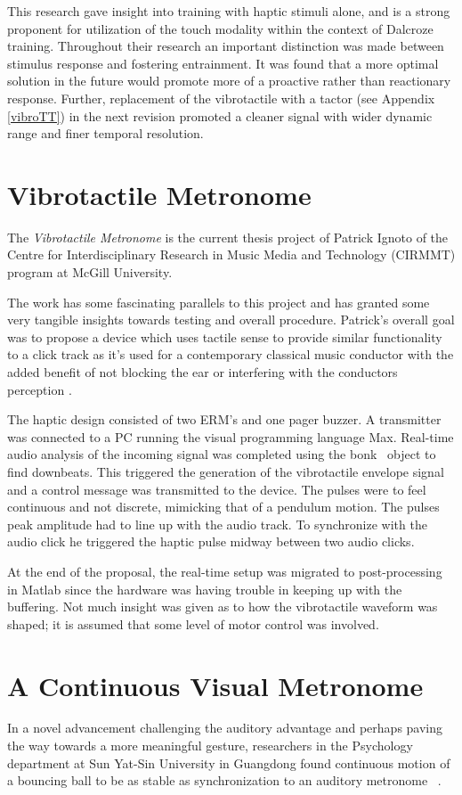 This research gave insight into training with haptic stimuli alone, and is a strong proponent for utilization of the touch modality within the context of Dalcroze training. Throughout their research an important distinction was made between stimulus response and fostering entrainment. It was found that a more optimal solution in the future would promote more of a proactive rather than reactionary response. Further, replacement of the vibrotactile with a tactor (see Appendix \ref{vibroTT}) in the next revision promoted a cleaner signal with wider dynamic range and finer temporal resolution.

\section{Vibrotactile Metronome} \label{vibrotactileMetronome}
The \textit{Vibrotactile Metronome} is the current thesis project of Patrick Ignoto of the Centre for Interdisciplinary Research in Music Media and Technology (CIRMMT) program at McGill University.

The work has some fascinating parallels to this project and has granted some very tangible insights towards testing and overall procedure. Patrick’s overall goal was to propose a device which uses tactile sense to provide similar functionality to a click track as it’s used for a contemporary classical music conductor with the added benefit of not blocking the ear or interfering with the conductors perception \cite{ignoto2017development}.

The haptic design consisted of two ERM’s and one pager buzzer. A transmitter was connected to a PC running the visual programming language Max. Real-time audio analysis of the incoming signal was completed using the bonk~ object to find downbeats. This triggered the generation of the vibrotactile envelope signal and a control message was transmitted to the device. The pulses were to feel continuous and not discrete, mimicking that of a pendulum motion. The pulses peak amplitude had to line up with the audio track. To synchronize with the audio click he triggered the haptic pulse midway between two audio clicks.

At the end of the proposal, the real-time setup was migrated to post-processing in Matlab since the hardware was having trouble in keeping up with the buffering. Not much insight was given as to how the vibrotactile waveform was shaped; it is assumed that some level of motor control was involved.

\section{A Continuous Visual Metronome} \label{visualMet}
In a novel advancement challenging the auditory advantage and perhaps paving the way towards a more meaningful gesture, researchers in the Psychology department at Sun Yat-Sin University in Guangdong found continuous motion of a bouncing ball to be as stable as synchronization to an auditory metronome
~\cite{gan2015synchronization}.

